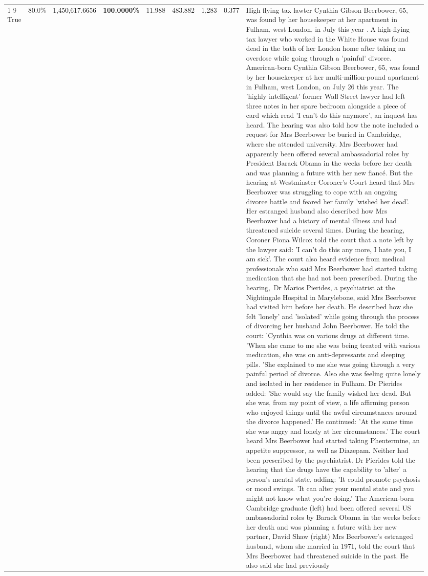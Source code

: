 \begin{table}[H]
\begin{tabular}{lllrlllll}
\cline{1-9}
True & 80.0\% & 1,450,617.6656 & \bfseries \color{red} 100.0000\% & 11.988 & 483.882 & 1,283 & 0.377 & High-flying tax lawter Cynthia Gibson Beerbower, 65, was found by her housekeeper at her apartment in Fulham, west London, in July this year . A high-flying tax lawyer who worked in the White House was found dead in the bath of her London home after taking an overdose while going through a 'painful' divorce. American-born Cynthia Gibson Beerbower, 65, was found by her housekeeper at her multi-million-pound apartment in Fulham, west London, on July 26 this year. The 'highly intelligent' former Wall Street lawyer had left three notes in her spare bedroom alongside a piece of card which read 'I can't do this anymore', an inquest has heard. The hearing was also told how the note included a request for Mrs Beerbower be buried in Cambridge, where she attended university. Mrs Beerbower had apparently been offered several ambassadorial roles by President Barack Obama in the weeks before her death and was planning a future with her new fiancé. But the hearing at Westminster Coroner's Court heard that Mrs Beerbower was struggling to cope with an ongoing divorce battle and feared her family 'wished her dead'. Her estranged husband also described how Mrs Beerbower had a history of mental illness and had threatened suicide several times. During the hearing, Coroner Fiona Wilcox told the court that a note left by the lawyer said: 'I can't do this any more, I hate you, I am sick'. The court also heard evidence from medical professionals who said Mrs Beerbower had started taking medication that she had not been prescribed. During the hearing, Dr Marios Pierides, a psychiatrist at the Nightingale Hospital in Marylebone, said Mrs Beerbower had visited him before her death. He described how she felt 'lonely' and 'isolated' while going through the process of divorcing her husband John Beerbower. He told the court: 'Cynthia was on various drugs at different time. 'When she came to me she was being treated with various medication, she was on anti-depressants and sleeping pills. 'She explained to me she was going through a very painful period of divorce. Also she was feeling quite lonely and isolated in her residence in Fulham. Dr Pierides added: 'She would say the family wished her dead. But she was, from my point of view, a life affirming person who enjoyed things until the awful circumstances around the divorce happened.' He continued: 'At the same time she was angry and lonely at her circumstances.' The court heard Mrs Beerbower had started taking Phentermine, an appetite suppressor, as well as Diazepam. Neither had been prescribed by the psychiatrist. Dr Pierides told the hearing that the drugs have the capability to 'alter' a person's mental state, adding: 'It could promote psychosis or mood swings. 'It can alter your mental state and you might not know what you're doing.' The American-born Cambridge graduate (left) had been offered several US ambassadorial roles by Barack Obama in the weeks before her death and was planning a future with her new partner, David Shaw (right) Mrs Beerbower's estranged husband, whom she married in 1971, told the court that Mrs Beerbower had threatened suicide in the past. He also said she had previously 
\end{tabular}
\end{table}
